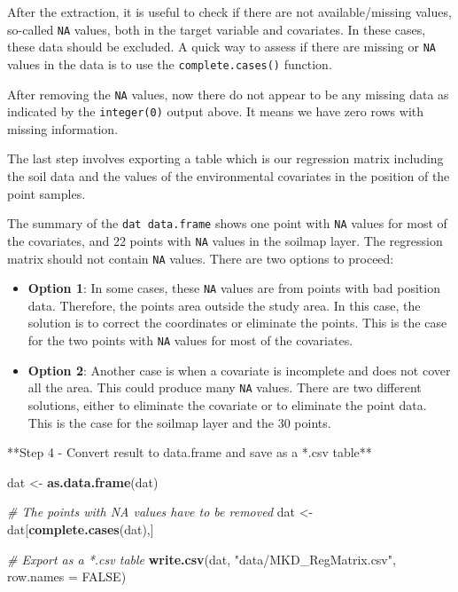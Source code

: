 \documentclass[10pt,b5paper,]{book}
\newenvironment{Shaded}{\begin{snugshade}}{\end{snugshade}}
\newcommand{\CommentTok}[1]{\textcolor[rgb]{0.56,0.35,0.01}{\textit{#1}}}
\newcommand{\DataTypeTok}[1]{\textcolor[rgb]{0.13,0.29,0.53}{#1}}
\newcommand{\KeywordTok}[1]{\textcolor[rgb]{0.13,0.29,0.53}{\textbf{#1}}}
\newcommand{\NormalTok}[1]{#1}
\newcommand{\OtherTok}[1]{\textcolor[rgb]{0.56,0.35,0.01}{#1}}
\newcommand{\StringTok}[1]{\textcolor[rgb]{0.31,0.60,0.02}{#1}}
\theoremstyle{definition}
\theoremstyle{definition}
\theoremstyle{definition}
\theoremstyle{remark}
\begin{document}
After the extraction, it is useful to check if there are not
available/missing values, so-called \texttt{NA} values, both in the
target variable and covariates. In these cases, these data should be
excluded. A quick way to assess if there are missing or \texttt{NA}
values in the data is to use the \texttt{complete.cases()} function.

After removing the \texttt{NA} values, now there do not appear to be any
missing data as indicated by the \texttt{integer(0)} output above. It
means we have zero rows with missing information.

The last step involves exporting a table which is our regression matrix
including the soil data and the values of the environmental covariates
in the position of the point samples.

The summary of the \texttt{dat\ data.frame} shows one point with
\texttt{NA} values for most of the covariates, and 22 points with
\texttt{NA} values in the soilmap layer. The regression matrix should
not contain \texttt{NA} values. There are two options to proceed:

\begin{itemize}
\item
  \textbf{Option 1}: In some cases, these \texttt{NA} values are from
  points with bad position data. Therefore, the points area outside the
  study area. In this case, the solution is to correct the coordinates
  or eliminate the points. This is the case for the two points with
  \texttt{NA} values for most of the covariates.
\item
  \textbf{Option 2}: Another case is when a covariate is incomplete and
  does not cover all the area. This could produce many \texttt{NA}
  values. There are two different solutions, either to eliminate the
  covariate or to eliminate the point data. This is the case for the
  soilmap layer and the 30 points.
\end{itemize}

**Step 4 - Convert result to data.frame and save as a *.csv table**

\begin{Shaded}
\begin{Highlighting}[]
\NormalTok{dat <-}\StringTok{ }\KeywordTok{as.data.frame}\NormalTok{(dat)}

\CommentTok{# The points with NA values have to be removed }
\NormalTok{dat <-}\StringTok{ }\NormalTok{dat[}\KeywordTok{complete.cases}\NormalTok{(dat),]}

\CommentTok{# Export as a *.csv table}
\KeywordTok{write.csv}\NormalTok{(dat, }\StringTok{"data/MKD_RegMatrix.csv"}\NormalTok{, }\DataTypeTok{row.names =} \OtherTok{FALSE}\NormalTok{)}
\end{Highlighting}
\end{Shaded}
\end{document}
